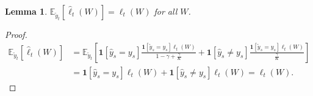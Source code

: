 \documentclass{article}
\newcommand{\one}{\boldsymbol{1}}
\newcommand{\field}[1]{\mathbb{#1}}
\newcommand{\E}{\field{E}}
\newtheorem{lemma}[theorem]{Lemma}
\DeclareMathOperator*{\argmax}{\arg\!\max}
\begin{document}




\begin{lemma}
$\E_{\tilde{y}_t}[\hat{\ell}_t(W)] = \ell_t(W)$ for all $W$. 
\end{lemma}
\begin{proof}
\begin{align*}
\E_{\tilde{y}_t}[\hat{\ell}_t(W)] &= \E_{\tilde{y}_t}\left[ \one[\hat{y}_s=y_s] \frac{\one[\tilde{y}_s=y_s]\ell_t(W)}{1-\gamma+\frac{\gamma}{K}}   +
\one[\hat{y}_s\neq y_s] \frac{\one[\tilde{y}_s = y_s]\ell_t(W)}{\frac{\gamma}{K}}\right] \\
& = \one[\hat{y}_s=y_s] \ell_t(W)   +
\one[\hat{y}_s\neq y_s] \ell_t(W) = \ell_t(W). 
\end{align*}
\end{proof}
\end{document}
